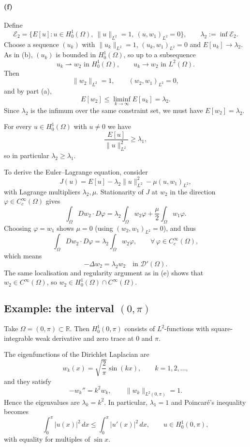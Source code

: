 \documentclass[12pt,a4paper]{article}
\theoremstyle{plain}
\theoremstyle{definition}
\theoremstyle{remark}
\theoremstyle{remark}
\begin{document}
\paragraph{(f)} Define
\[
\mathcal{E}_2
=\{E[u]:u\in H_0^1(\Omega),\ \|u\|_{L^2}=1,\ (u,w_1)_{L^2}=0\},
\qquad
\lambda_2:=\inf\mathcal{E}_2.
\]
Choose a sequence $(u_k)$ with $\|u_k\|_{L^2}=1$,
$(u_k,w_1)_{L^2}=0$ and $E[u_k]\to\lambda_2$. As in (b),
$(u_k)$ is bounded in $H_0^1(\Omega)$, so up to a subsequence
\[
u_k\rightharpoonup w_2\text{ in }H_0^1(\Omega),
\qquad
u_k\to w_2\text{ in }L^2(\Omega).
\]
Then
\[
\|w_2\|_{L^2}=1,\qquad (w_2,w_1)_{L^2}=0,
\]
and by part (a),
\[
E[w_2]\le\liminf_{k\to\infty}E[u_k]=\lambda_2.
\]
Since $\lambda_2$ is the infimum over the same constraint set,
we must have $E[w_2]=\lambda_2$.

For every $u\in H_0^1(\Omega)$ with $u\neq 0$ we have
\[
\frac{E[u]}{\|u\|_{L^2}^2}\ge\lambda_1,
\]
so in particular $\lambda_2\ge\lambda_1$.

To derive the Euler--Lagrange equation, consider
\[
J(u)=E[u]-\lambda_2\|u\|_{L^2}^2-\mu (u,w_1)_{L^2},
\]
with Lagrange multipliers $\lambda_2,\mu$. Stationarity of $J$ at $w_2$
in the direction $\varphi\in C_c^\infty(\Omega)$ gives
\[
\int_\Omega Dw_2\cdot D\varphi
=\lambda_2\int_\Omega w_2\varphi + \frac{\mu}{2}\int_\Omega w_1\varphi.
\]
Choosing $\varphi=w_1$ shows $\mu=0$ (using $(w_2,w_1)_{L^2}=0$), and thus
\[
\int_\Omega Dw_2\cdot D\varphi
=\lambda_2\int_\Omega w_2\varphi,\qquad
\forall\,\varphi\in C_c^\infty(\Omega),
\]
which means
\[
-\Delta w_2=\lambda_2 w_2\quad\text{in }\mathcal{D}'(\Omega).
\]
The same localisation and regularity argument as in (e) shows that
$w_2\in C^\infty(\Omega)$, so $w_2\in H_0^1(\Omega)\cap C^\infty(\Omega)$.
\qedhere

\subsection*{Example: the interval $(0,\pi)$}

Take $\Omega=(0,\pi)\subset\mathbb{R}$. Then
$H_0^1(0,\pi)$ consists of $L^2$-functions with square-integrable weak
derivative and zero trace at $0$ and $\pi$.

The eigenfunctions of the Dirichlet Laplacian are
\[
w_k(x) = \sqrt{\frac{2}{\pi}}\sin(kx),\qquad k=1,2,\dots,
\]
and they satisfy
\[
-w_k'' = k^2 w_k,\qquad \|w_k\|_{L^2(0,\pi)}=1.
\]
Hence the eigenvalues are $\lambda_k = k^2$. In particular,
$\lambda_1=1$ and Poincar\'e's inequality becomes
\[
\int_0^\pi |u(x)|^2\,dx \le \int_0^\pi |u'(x)|^2\,dx,
\qquad u\in H_0^1(0,\pi),
\]
with equality for multiples of $\sin x$.
\end{document}
